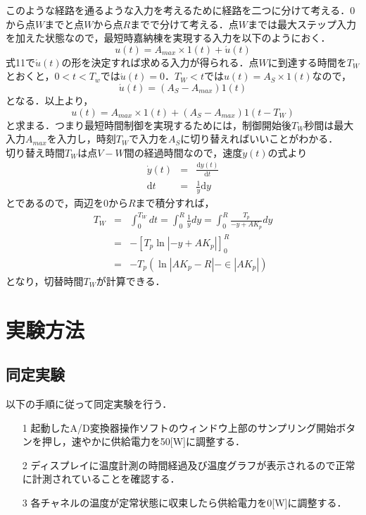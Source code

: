 \documentclass[11pt,a4paper]{jsarticle}
\begin{document}
このような経路を通るような入力を考えるために経路を二つに分けて考える．$0$から点$W$までと点$W$から点$R$までで分けて考える．点$W$までは最大ステップ入力を加えた状態なので，最短時嘉納棟を実現する入力を以下のようにおく．
\begin{equation}
 u(t) = A_{max} \times 1(t) + \acute{u}(t)
\end{equation}
式11で$\acute{u}(t)$の形を決定すれば求める入力が得られる．点$W$に到達する時間を$T_W$とおくと，$0 < t < T_w$では$\acute{u}(t) = 0$．$T_W < t$では$u(t) = A_S \times 1(t)$なので，
\begin{equation}
 \acute{u}(t) = (A_S - A_{max})1(t)
\end{equation}
となる．以上より，
\begin{equation}
 u(t) = A_{max} \times 1(t) + (A_S - A_{max})1(t - T_W)
\end{equation}
と求まる．つまり最短時間制御を実現するためには，制御開始後$T_W$秒間は最大入力$A_{max}$を入力し，時刻$T_W$で入力を$A_S$に切り替えればいいことがわかる．\\
切り替え時間$T_W$は点$V-W$間の経過時間なので，速度$\dot y(t)$の式より
\begin{eqnarray}
 \dot y(t) & = &\frac{\mathrm{d}y(t)}{\mathrm{d}t} \\
 \mathrm{d}t & = &\frac{1}{\dot{y}} \mathrm{d}y
\end{eqnarray}
とであるので，両辺を$0$から$R$まで積分すれば，
\begin{eqnarray}
 T_W & = &\int_0^{T_W} dt = \int_0^R \frac{1}{\dot y} dy = \int_0^R \frac{T_p}{-y+AK_p} dy \\
 & = &-\left[ T_p \ln|-y + AK_p| \right]_0^R \\
 & = &-T_p( \ln|AK_p - R| - \in|AK_p|)
\end{eqnarray}
となり，切替時間$T_W$が計算できる．


 \section{実験方法}
  \subsection{同定実験}
  以下の手順に従って同定実験を行う．
   \begin{itemize}
    \item[1] 起動したA/D変換器操作ソフトのウィンドウ上部のサンプリング開始ボタンを押し，速やかに供給電力を50[W]に調整する．
    \item[2] ディスプレイに温度計測の時間経過及び温度グラフが表示されるので正常に計測されていることを確認する．
    \item[3] 各チャネルの温度が定常状態に収束したら供給電力を0[W]に調整する．
   \end{itemize}
\end{document}
